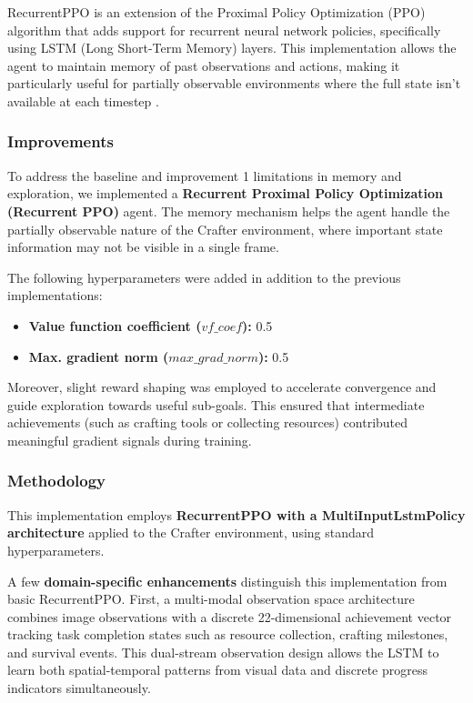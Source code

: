 \documentclass[twocolumn]{article}
\begin{document}
RecurrentPPO is an extension of the Proximal Policy Optimization (PPO) algorithm that adds support for recurrent neural network policies, specifically using LSTM (Long Short-Term Memory) layers. This implementation allows the agent to maintain memory of past observations and actions, making it particularly useful for partially observable environments where the full state isn't available at each timestep \parencite{salim}.

\subsubsection*{Improvements}
To address the baseline and improvement 1 limitations in memory and exploration, we implemented a \textbf{Recurrent Proximal Policy Optimization (Recurrent PPO)} agent. The memory mechanism helps the agent handle the partially observable nature of the Crafter environment, where important state information may not be visible in a single frame.

The following hyperparameters were added in addition to the previous implementations:

\begin{itemize}
    \item \textbf{Value function coefficient ($vf\_coef$):} 0.5
    \item \textbf{Max. gradient norm ($max\_grad\_norm$):} 0.5
\end{itemize}

Moreover, slight reward shaping was employed to accelerate convergence and guide exploration towards useful sub-goals. This ensured that intermediate achievements (such as crafting tools or collecting resources) contributed meaningful gradient signals during training.
\subsubsection*{Methodology}

This implementation employs \textbf{RecurrentPPO with a MultiInputLstmPolicy architecture} applied to the Crafter environment, using standard hyperparameters.

A few \textbf{domain-specific enhancements} distinguish this implementation from basic RecurrentPPO. First, a multi-modal observation space architecture combines image observations with a discrete 22-dimensional achievement vector tracking task completion states such as resource collection, crafting milestones, and survival events. This dual-stream observation design allows the LSTM to learn both spatial-temporal patterns from visual data and discrete progress indicators simultaneously.
\end{document}
